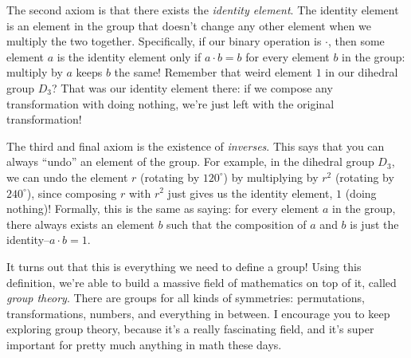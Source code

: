 \documentclass{article}
\begin{document}
The second axiom is that there exists the \emph{identity element}. The identity element is an element in the group that doesn't change any other element when we multiply the two together. Specifically, if our binary operation is $\cdot$, then some element $a$ is the identity element only if $a\cdot b=b$ for every element $b$ in the group: multiply by $a$ keeps $b$ the same! Remember that weird element $1$ in our dihedral group $D_3$? That was our identity element there: if we compose any transformation with doing nothing, we're just left with the original transformation!

The third and final axiom is the existence of \emph{inverses}. This says that you can always ``undo'' an element of the group. For example, in the dihedral group $D_3$, we can undo the element $r$ (rotating by $120^\circ$) by multiplying by $r^2$ (rotating by $240^\circ$), since composing $r$ with $r^2$ just gives us the identity element, $1$ (doing nothing)! Formally, this is the same as saying: for every element $a$ in the group, there always exists an element $b$ such that the composition of $a$ and $b$ is just the identity--$a\cdot b=1$.

It turns out that this is everything we need to define a group! Using this definition, we're able to build a massive field of mathematics on top of it, called \emph{group theory}. There are groups for all kinds of symmetries: permutations, transformations, numbers, and everything in between. I encourage you to keep exploring group theory, because it's a really fascinating field, and it's super important for pretty much anything in math these days.
\end{document}
